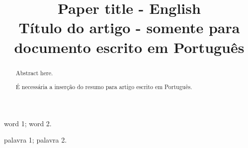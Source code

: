 \documentclass[conference]{IEEEtran}
\begin{document}
%
\title{Paper title - English \\ T\'{i}tulo do artigo - somente para documento escrito em Portugu\^{e}s}




% 
\author{
}


\maketitle

\thispagestyle{fancy}

\renewcommand{\abstractname}{Abstract}
\begin{abstract}
Abstract here.
\end{abstract}

\renewcommand\IEEEkeywordsname{Keywords}
\begin{IEEEkeywords}
\label{Keywords}
word 1; word 2.
\end{IEEEkeywords}

\renewcommand{\abstractname}{Resumo}
\begin{abstract}
\label{Resumo}
\'E necess\'aria a inser\c{c}\~{a}o do resumo para artigo escrito em Portugu\^{e}s.
\end{abstract}

\renewcommand\IEEEkeywordsname{Palavras-chave}
\begin{IEEEkeywords}
\label{Palavras-chave}
palavra 1; palavra 2.
\end{IEEEkeywords}
\end{document}
